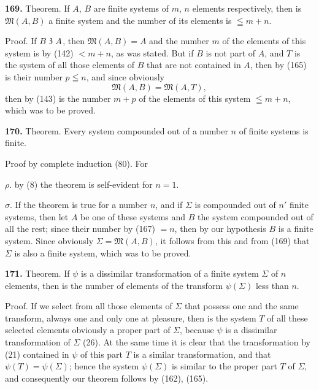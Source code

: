 \documentclass[oneside]{book}
\newcommand\partof{\mathrel{\raisebox{0.45ex}{$\mathfrak{3}$}}}   %
\newcommand\mypara{\medskip\textbf}
\begin{document}
\mypara{169.} Theorem. If $A$, $B$ are finite systems of $m$, $n$
elements respectively, then is $\mathfrak{M}(A,B)$ a finite system
and the number of its elements is $\leqq m+n$.

Proof. If $B \partof A$, then $\mathfrak{M}(A,B)=A$ and the
number $m$ of the elements of this system is by (142)
$<m+n$, as was stated. But if $B$ is not part of $A$,
and $T$ is the system of all those elements of $B$ that
are not contained in $A$, then by (165) is their number
$p \leqq n$, and since obviously
\[
\mathfrak{M}(A,B)=\mathfrak{M}(A,T),
\]
then by (143) is the number $m+p$ of the elements of
this system $\leqq m+n$, which was to be proved.

\mypara{170.} Theorem. Every system compounded out of
a number $n$ of finite systems is finite.

Proof by complete induction (80). For

$\rho$. by (8) the theorem is self-evident for $n = 1$.

$\sigma$. If the theorem is true for a number $n$, and if $\Sigma$
is compounded out of $n'$ finite systems, then let $A$ be
one of these systems and $B$ the system compounded
out of all the rest; since their number by (167) $=n$,
then by our hypothesis $B$ is a finite system. Since
obviously $\Sigma=\mathfrak{M}(A,B)$, it follows from this and from
(169) that $\Sigma$ is also a finite system, which was to be
proved.

\mypara{171.} Theorem. If $\psi$ is a dissimilar transformation
of a finite system $\Sigma$ of $n$ elements, then is the number
of elements of the transform $\psi(\Sigma)$ less than $n$.

Proof. If we select from all those elements of $\Sigma$
that possess one and the same transform, always one
and only one at pleasure, then is the system $T$ of all
these selected elements obviously a proper part of
$\Sigma$, because $\psi$ is a dissimilar transformation of $\Sigma$ (26).
At the same time it is clear that the transformation
by (21) contained in $\psi$ of this part $T$ is a similar transformation,
and that $\psi(T)=\psi(\Sigma)$; hence the system
$\psi(\Sigma)$ is similar to the proper part $T$ of $\Sigma$, and consequently
our theorem follows by (162), (165).
\end{document}
